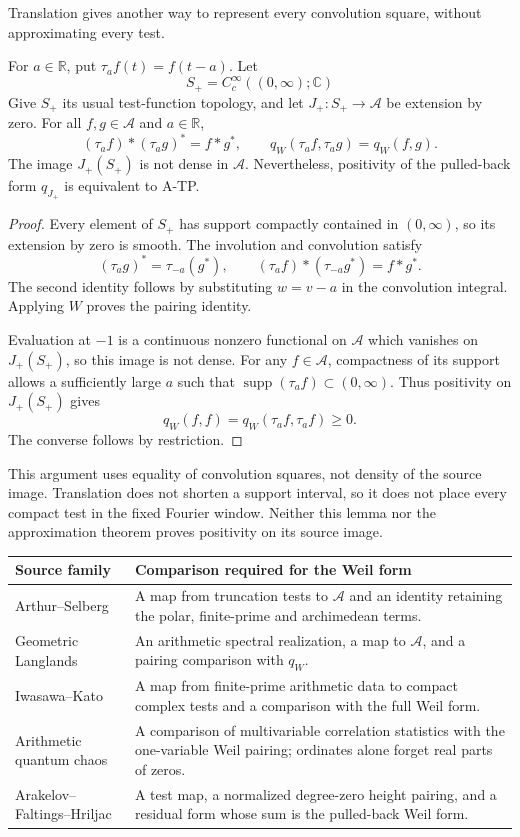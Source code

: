 Translation gives another way to represent every convolution square,
without approximating every test.

\begin{lemma}
\label{v4-arith:w8-atp:lem:translation-transfer}
For $a\in\mathbb R$, put $\tau_a f(t)=f(t-a)$.
Let
\[
 S_+=C_c^\infty((0,\infty);\mathbb C)
\]
Give $S_+$ its usual test-function topology, and let
$J_+:S_+\to\mathscr A$ be extension by zero.
For all $f,g\in\mathscr A$ and $a\in\mathbb R$,
\[
 (\tau_a f)*(\tau_a g)^*=f*g^*,
 \qquad q_W(\tau_a f,\tau_a g)=q_W(f,g).
\]
The image $J_+(S_+)$ is not dense in $\mathscr A$.
Nevertheless, positivity of the pulled-back form $q_{J_+}$
is equivalent to A-TP.
\end{lemma}
\begin{proof}
Every element of $S_+$ has support compactly contained in
$(0,\infty)$, so its extension by zero is smooth.
The involution and convolution satisfy
\[
 (\tau_a g)^*=\tau_{-a}(g^*),\qquad
 (\tau_a f)*(\tau_{-a}g^*)=f*g^*.
\]
The second identity follows by substituting $w=v-a$ in
the convolution integral. Applying $W$ proves the pairing identity.

Evaluation at $-1$ is a continuous nonzero functional on
$\mathscr A$ which vanishes on $J_+(S_+)$, so this image is
not dense. For any $f\in\mathscr A$, compactness of its support
allows a sufficiently large $a$ such that
$\operatorname{supp}(\tau_a f)\subset(0,\infty)$.
Thus positivity on $J_+(S_+)$ gives
\[
 q_W(f,f)=q_W(\tau_a f,\tau_a f)\geq0.
\]
The converse follows by restriction.
\end{proof}

This argument uses equality of convolution squares, not density
of the source image. Translation does not shorten a support interval,
so it does not place every compact test in the fixed Fourier window.
Neither this lemma nor the approximation theorem proves positivity
on its source image.

\begin{center}
\small
\begin{tabular}{p{3.4cm}p{8cm}}
\toprule
Source family & Comparison required for the Weil form \\
\midrule
Arthur--Selberg & A map from truncation tests to $\mathscr A$ and an
identity retaining the polar, finite-prime and archimedean terms. \\
Geometric Langlands & An arithmetic spectral realization, a map to
$\mathscr A$, and a pairing comparison with $q_W$. \\
Iwasawa--Kato & A map from finite-prime arithmetic data to compact
complex tests and a comparison with the full Weil form. \\
Arithmetic quantum chaos & A comparison of multivariable correlation
statistics with the one-variable Weil pairing; ordinates alone forget
real parts of zeros. \\
Arakelov--Faltings--Hriljac & A test map, a normalized degree-zero height
pairing, and a residual form whose sum is the pulled-back Weil form. \\
\bottomrule
\end{tabular}
\end{center}

